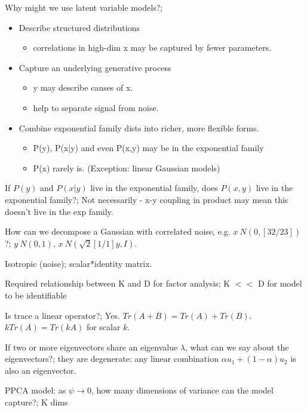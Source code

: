 \documentclass{article}
\begin{document}
Why might we use latent variable models?; \begin{itemize} \item Describe structured distributions \begin{itemize} \item correlations in high-dim x may be captured by fewer parameters.  \end{itemize} \item Capture an underlying generative process \begin{itemize} \item y may describe causes of x.  \item help to separate signal from noise.  \end{itemize} \item Combine exponential family dists into richer, more flexible forms.  \begin{itemize} \item P(y), P(x|y) and even P(x,y) may be in the exponential family \item P(x) rarely is. (Exception: linear Gaussian models) \end{itemize} \end{itemize}

If $P(y)$ and $P(x|y)$ live in the exponential family, does $P(x,y)$ live in the exponential family?; Not necessarily - x-y coupling in product may mean this doesn't live in the exp family.

How can we decompose a Gaussian with correlated noise, e.g. $x~N(0, [ 3 2 / 2 3])$?; $y~N(0,1)$, $x~N(\sqrt{2}[1 / 1]y, I)$.

Isotropic (noise); scalar*identity matrix.

Required relationship between K and D for factor analysis; K $<<$ D for model to be identifiable

Is trace a linear operator?; Yes. $Tr(A+B) = Tr(A)+Tr(B)$. $kTr(A) = Tr(kA)$ for scalar $k$.

If two or more eigenvectors share an eigenvalue $\lambda$, what can we say about the eigenvectors?; they are degenerate: any linear combination $\alpha u_1 + (1-\alpha)u_2$ is also an eigenvector.

PPCA model: as $\psi\rightarrow 0$, how many dimensions of variance can the model capture?; K dims
\end{document}
